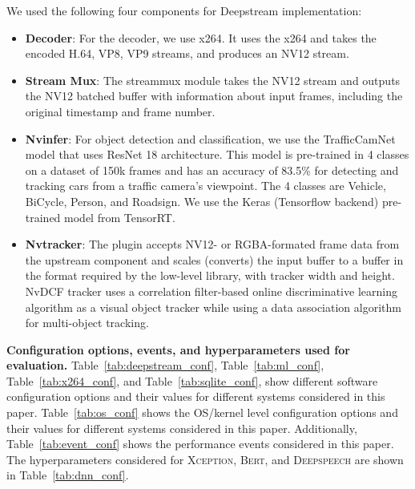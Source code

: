 We used the following four components for Deepstream implementation:

\begin{itemize}
\item \textbf{Decoder}: For the decoder, we use x264. It uses the x264 and takes the encoded H.64, VP8, VP9 streams, and produces an NV12 stream.

\item \textbf{Stream Mux}:
The streammux module takes the NV12 stream and outputs the NV12 batched buffer with information about input frames, including the original timestamp and frame number.

\item \textbf{Nvinfer}:
For object detection and classification, we use the TrafficCamNet model that uses ResNet 18 architecture. This model is pre-trained in 4 classes on a dataset of 150k frames and has an accuracy of 83.5\% for detecting and tracking cars from a traffic camera's viewpoint. The 4 classes are Vehicle, BiCycle, Person, and Roadsign. We use the Keras (Tensorflow backend) pre-trained model from TensorRT.


\item \textbf{Nvtracker}:
The plugin accepts NV12- or RGBA-formated frame data from the upstream component and scales (converts) the input buffer to a buffer in the format required by the low-level library, with tracker width and height. NvDCF tracker uses a correlation filter-based online discriminative learning algorithm as a visual object tracker while using a data association algorithm for multi-object tracking. 
\end{itemize}

\noindent \textbf{Configuration options, events, and hyperparameters used for evaluation.}
Table~\ref{tab:deepstream_conf}, Table~\ref{tab:ml_conf}, Table~\ref{tab:x264_conf}, and Table~\ref{tab:sqlite_conf}, show different software configuration options and their values for different systems considered in this paper. Table~\ref{tab:os_conf} shows the OS/kernel level configuration options and their values for different systems considered in this paper. Additionally, Table~\ref{tab:event_conf}
shows the performance events considered in this paper. The hyperparameters considered for \textsc{Xception}, \textsc{Bert}, and \textsc{Deepspeech} are shown in Table~\ref{tab:dnn_conf}.



